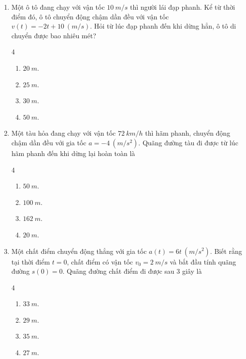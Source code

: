 \documentclass[12pt]{article}
\begin{document}
\begin{enumerate}[label=\textbf{Câu \arabic*.}]
		\item Một ô tô đang chạy với vận tốc $10 \ m/s$ thì người lái đạp phanh. Kể từ thời điểm đó, ô tô chuyển động chậm dần đều với vận tốc $v(t) = -2t + 10 \ (m/s)$. Hỏi từ lúc đạp phanh đến khi dừng hẳn, ô tô di chuyển được bao nhiêu mét?
		\begin{multicols}{4}
			\begin{enumerate}[label=\textbf{\Alph*.}]
				\item $20 \ m$.
				\item $25 \ m$.
				\item $30 \ m$.
				\item $50 \ m$.
			\end{enumerate}
		\end{multicols}
		
		\item Một tàu hỏa đang chạy với vận tốc $72 \ km/h$ thì hãm phanh, chuyển động chậm dần đều với gia tốc $a = -4 \ (m/s^2)$. Quãng đường tàu đi được từ lúc hãm phanh đến khi dừng lại hoàn toàn là
		\begin{multicols}{4}
			\begin{enumerate}[label=\textbf{\Alph*.}]
				\item $50 \ m$.
				\item $100 \ m$.
				\item $162 \ m$.
				\item $20 \ m$.
			\end{enumerate}
		\end{multicols}
		
		\item Một chất điểm chuyển động thẳng với gia tốc $a(t) = 6t \ (m/s^2)$. Biết rằng tại thời điểm $t = 0$, chất điểm có vận tốc $v_0 = 2 \ m/s$ và bắt đầu tính quãng đường $s(0) = 0$. Quãng đường chất điểm đi được sau $3$ giây là
		\begin{multicols}{4}
			\begin{enumerate}[label=\textbf{\Alph*.}]
				\item $33 \ m$.
				\item $29 \ m$.
				\item $35 \ m$.
				\item $27 \ m$.
			\end{enumerate}
		\end{multicols}
		

\end{enumerate}
\end{document}
